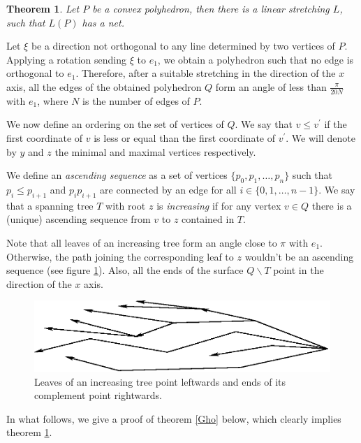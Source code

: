 \documentclass[openright, 12pt]{article}
\newtheorem{teorema}{Theorem}
\begin{document}
\begin{teorema}\label{Str}
{\rm Let $P$ be a convex polyhedron, then there is a linear stretching $L$, such that $L(P)$ has a net.}
\end{teorema}



Let $\xi $ be a direction not orthogonal to any line determined by two vertices of $P$. Applying a rotation sending $\xi $ to $e_1 $, we obtain a polyhedron such that no edge is orthogonal to $e_1$. Therefore, after a suitable stretching in the direction of the $x$ axis, all the edges of the obtained polyhedron $Q$  form an angle of less than $\frac{\pi}{20 N}$ with $e_1$, where $N$ is the number of edges of $P$.


We now define an ordering on the set of vertices of $Q$. We say that $v \leq v^{\prime}$ if the first coordinate of $v$ is less or equal than the first coordinate of $v^{\prime}$. We will denote by $y$ and $z$ the minimal and maximal vertices respectively.

We define an \textit{ascending sequence} as a set of vertices $\{ p_0, p_1, \ldots , p_n   \}$ such that $p_i \leq p_{i+1}$ and $p_i p_{i+1}$ are connected by an edge for all $i \in \{ 0,1, \ldots, n-1 \} $. We say that a spanning tree $T$ with root $z$ is \textit{increasing} if for any vertex $v\in Q$ there is a (unique) ascending sequence from $v$ to $z$ contained in $T$. 

Note that all leaves of an increasing tree form an angle close to $\pi$ with $e_1$. Otherwise, the path joining the corresponding leaf to $z$ wouldn't be an ascending sequence (see figure \ref{Mon}). Also, all the ends of the surface $Q \backslash T$ point in the direction of the $x$ axis.




\begin{figure}[h]
\centering
\includegraphics[scale=0.84]{Mono2.eps}
\caption{Leaves of an increasing tree point leftwards and ends of its complement point rightwards.}\label{Mon}
\end{figure}



In what follows, we give a proof of theorem \ref{Gho} below, which clearly implies theorem \ref{Str}. 
\end{document}
